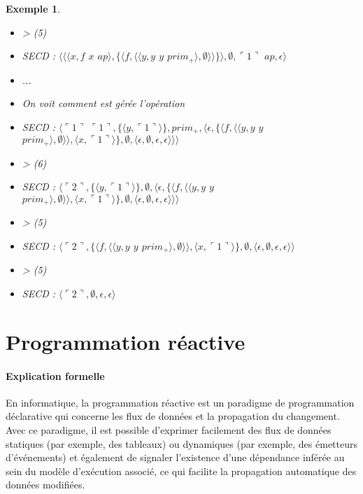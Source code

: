 \documentclass[10pt,a4paper]{report}
\newtheorem{ex}{Exemple}
\begin{document}
\begin{ex}
\begin{itemize}
			\item[] > (5)
			\item[] SECD : $\langle\langle\langle x,f$ $x$ $ap\rangle,\{\langle f,\langle\langle y,y$ $y$ $prim_{+}\rangle,\emptyset\rangle\rangle\}\rangle,\emptyset,\ulcorner 1\urcorner$ $ap,\epsilon\rangle$
			\item[] ...
			\item[] On voit comment est gérée l'opération
			\item[] SECD : $\langle\ulcorner 1\urcorner$ $\ulcorner 1\urcorner,\{\langle y,\ulcorner 1\urcorner\rangle\},prim_{+},\langle\epsilon,\{\langle f,\langle\langle y,y$ $y$ $prim_{+}\rangle,\emptyset\rangle\rangle,\langle x,\ulcorner 1\urcorner\rangle\} ,\emptyset,\langle\epsilon,\emptyset,\epsilon,\epsilon\rangle\rangle\rangle$
			\item[] > (6)
			\item[] SECD : $\langle\ulcorner 2\urcorner,\{\langle y,\ulcorner 1\urcorner\rangle\},\emptyset,\langle\epsilon,\{\langle f,\langle\langle y,y$ $y$ $prim_{+}\rangle,\emptyset\rangle\rangle,\langle x,\ulcorner 1\urcorner\rangle\} ,\emptyset,\langle\epsilon,\emptyset,\epsilon,\epsilon\rangle\rangle\rangle$
			\item[] > (5)
			\item[] SECD : $\langle\ulcorner 2\urcorner,\{\langle f,\langle\langle y,y$ $y$ $prim_{+}\rangle,\emptyset\rangle\rangle,\langle x,\ulcorner 1\urcorner\rangle\} ,\emptyset,\langle\epsilon,\emptyset,\epsilon,\epsilon\rangle\rangle$
			\item[] > (5)
			\item[] SECD : $\langle\ulcorner 2\urcorner,\emptyset,\epsilon,\epsilon\rangle$
		\end{itemize}
	\end{ex}
	\newpage
	
	
	
	\section{Programmation réactive}
	
	\paragraph{Explication formelle}
	En informatique, la programmation réactive est un paradigme de programmation déclarative qui concerne les flux de données et la propagation du changement. Avec ce paradigme, il est possible d’exprimer facilement des flux de données statiques (par exemple, des tableaux) ou dynamiques (par exemple, des émetteurs d’événements) et également de signaler l’existence d’une dépendance inférée au sein du modèle d’exécution associé, ce qui facilite la propagation automatique des données modifiées.
	\medbreak
	
\end{document}
